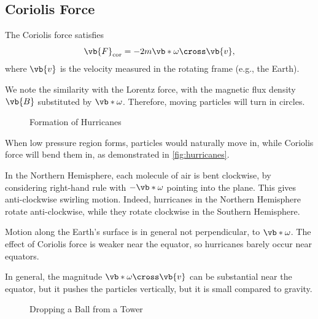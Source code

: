 \subsection{Coriolis Force}

The Coriolis force satisfies
\begin{equation}
    \vb{F}_{\text{cor}} = - 2 m \vb*{\omega} \cross \vb{v},
\end{equation}
where \(\vb{v}\) is the velocity measured in the rotating frame (e.g., the Earth).

We note the similarity with the Lorentz force, with the magnetic flux density \(\vb{B}\) substituted by \(\vb*{\omega}\). Therefore, moving particles will turn in circles.

\begin{figure}[ht!]
    \centering

    \caption{Formation of Hurricanes}
    \label{fig:hurricanes}%
\end{figure}

\begin{example}
    \label{ex:hurricanes}%
    When low pressure region forms, particles would naturally move in, while Coriolis force will bend them in, as demonstrated in \autoref{fig:hurricanes}.

    In the Northern Hemisphere, each molecule of air is bent clockwise, by considering right-hand rule with \(-\vb*{\omega}\) pointing into the plane. This gives anti-clockwise swirling motion. Indeed, hurricanes in the Northern Hemisphere rotate anti-clockwise, while they rotate clockwise in the Southern Hemisphere.

    Motion along the Earth's surface is in general not perpendicular, to \(\vb*{\omega}\). The effect of Coriolis force is weaker near the equator, so hurricanes barely occur near equators.

    In general, the magnitude \(\vb*{\omega} \cross \vb{v}\) can be substantial near the equator, but it pushes the particles vertically, but it is small compared to gravity.
\end{example}

\begin{figure}[ht!]
    \centering

    \caption{Dropping a Ball from a Tower}
    \label{fig:dropping-ball-from-tower}%
\end{figure}

